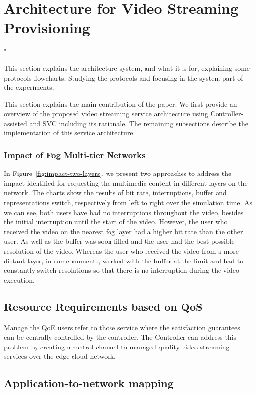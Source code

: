 \section{Architecture for Video Streaming Provisioning}
"\label{sec:system-archi}

{\color{blue} This section explains the architecture system, and what it is  for, explaining some protocols flowcharts. Studying the protocols and focusing in the system part of the experiments.}

This section explains the main contribution of the paper. We first provide an overview of the proposed video streaming service architecture using Controller-assisted and SVC including its rationale. The remaining subsections describe the implementation of this service architecture.

\subsubsection{Impact of Fog Multi-tier Networks}

In Figure~\ref{fig:impact-two-layers}, we present two approaches to address the impact identified for requesting the multimedia content in different layers on the network. The charts show the results of bit rate, interruptions, buffer and representations switch, respectively from left to right over the simulation time. As we can see, both users have had no interruptions throughout the video, besides the initial interruption until the start of the video. However, the user who received the video on the nearest fog layer had a higher bit rate than the other user. As well as the buffer was soon filled and the user had the best possible resolution of the video. Whereas the user who received the video from a more distant layer, in some moments, worked with the buffer at the limit and had to constantly switch resolutions so that there is no interruption during the video execution.

\subsection{Resource Requirements based on QoS}

Manage the QoE users refer to those service where the satisfaction guarantees can be centrally controlled by the controller. The Controller can address this problem by creating a control channel to managed-quality video streaming services over the edge-cloud network.

\subsection{Application-to-network mapping}


